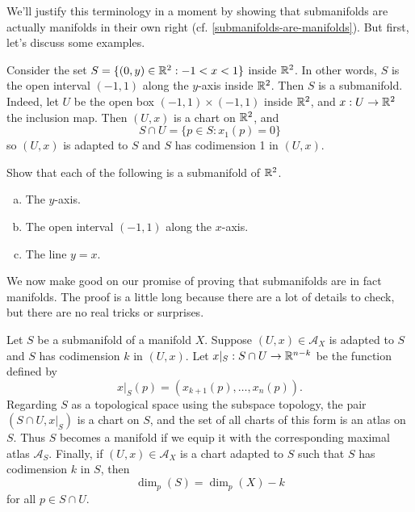 We'll justify this terminology in a moment by showing that submanifolds are actually manifolds in their own right (cf. \cref{submanifolds-are-manifolds}). But first, let's discuss some examples. 

\begin{example}
	Consider the set $S = \{ (0,y) \in \mathbb{R}^2 : -1 < x < 1 \}$ inside $\mathbb{R}^2$. In other words, $S$ is the open interval $(-1,1)$ along the $y$-axis inside $\mathbb{R}^2$. Then $S$ is a submanifold. Indeed, let $U$ be the open box $(-1,1) \times (-1,1)$ inside $\mathbb{R}^2$, and $x : U \to \mathbb{R}^2$ the inclusion map. Then $(U, x)$ is a chart on $\mathbb{R}^2$, and 
	\[ S \cap U = \{ p \in S : x_1(p) = 0 \} \]
	so $(U,x)$ is adapted to $S$ and $S$ has codimension 1 in $(U,x)$. 
\end{example}

\begin{exercise}
	Show that each of the following is a submanifold of $\mathbb{R}^2$. 
	\begin{enumerate}[(a)] 
		\item The $y$-axis. 
		\item The open interval $(-1,1)$ along the $x$-axis.
		\item The line $y = x$. 
	\end{enumerate}
\end{exercise}

We now make good on our promise of proving that submanifolds are in fact manifolds. The proof is a little long because there are a lot of details to check, but there are no real tricks or surprises. 

\begin{proposition} \label{submanifolds-are-manifolds}
	Let $S$ be a submanifold of a manifold $X$. Suppose $(U, x) \in \mathscr{A}_X$ is adapted to $S$ and $S$ has codimension $k$ in $(U, x)$. Let $x|_S : S \cap U \to \mathbb{R}^{n-k}$ be the function defined by 
	\[ x|_S(p) = (x_{k+1}(p), \dotsc, x_n(p)). \]
	Regarding $S$ as a topological space using the subspace topology, the pair $(S \cap U, x|_S)$ is a chart on $S$, and the set of all charts of this form is an atlas on $S$. Thus $S$ becomes a manifold if we equip it with the corresponding maximal atlas $\mathscr{A}_S$. Finally, if $(U, x) \in \mathscr{A}_X$ is a chart adapted to $S$ such that $S$ has codimension $k$ in $S$, then
	\[ \dim_p(S) = \dim_p(X) - k \]
	for all $p \in S \cap U$. 
\end{proposition}

